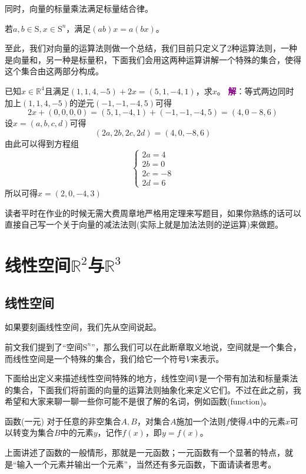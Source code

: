 同时，向量的标量乘法满足标量结合律。
\begin{corollary}
	若$a,b\in \mathrm{S},x\in \mathrm{S}^n$，满足$(ab)x=a(bx)$。
\end{corollary}

至此，我们对向量的运算法则做一个总结，我们目前只定义了2种运算法则，一种是向量和，另一种是标量积，下面我们会用这两种运算讲解一个特殊的集合，使得这个集合由这两部分构成。

\begin{example}
	已知$x\in \mathbb{R}^4$且满足$(1,1,4,-5)+2x=(5,1,-4,1)$，求$x$。
	\tcblower
	\textcolor{purple}{\textbf{解}}：等式两边同时加上$(1,1,4,-5)$的逆元$(-1,-1,-4,5)$可得$$2x+(0,0,0,0)=(5,1,-4,1)+(-1,-1,-4,5)=(4,0-8,6)$$设$x=(a,b,c,d)$可得$$(2a,2b,2c,2d)=(4,0,-8,6)$$由此可以得到方程组$$\left\{\begin{matrix} 
		2a=4 \\
		2b=0 \\
		2c=-8 \\
		2d=6
	\end{matrix}\right. $$所以可得$x=(2,0,-4,3)$
\end{example}

读者平时在作业的时候无需大费周章地严格用定理来写题目，如果你熟练的话可以直接自己写一个关于向量的减法法则(实际上就是加法法则的逆运算)来做题。

\section{线性空间$\mathbb{R}^2$与$\mathbb{R}^3$}
\subsection{线性空间}

如果要刻画线性空间，我们先从空间说起。

前文我们提到了``空间$\mathrm{S}^n$''，那么我们可以在此断章取义地说，空间就是一个集合，而线性空间是一个特殊的集合，我们给它一个符号$V$来表示。

下面给出定义来描述线性空间特殊的地方，线性空间$V$是一个带有加法和标量乘法的集合，下面我们将前面的向量的运算法则抽象化来定义它们。不过在此之前，我希望和大家来聊一聊一些你可能不是很了解的名词，例如函数(function)。
\begin{definition}{函数(一元)}
	对于任意的非空集合$A,B$，对集合$A$施加一个法则$f$使得$A$中的元素$x$可以转变为集合$B$中的元素$y$，记作$f(x)$，即$y=f(x)$。
\end{definition}

上面讲述了函数的一般情形，那就是一元函数；一元函数有一个显著的特点，就是``输入一个元素并输出一个元素''，当然还有多元函数，下面请读者思考。

